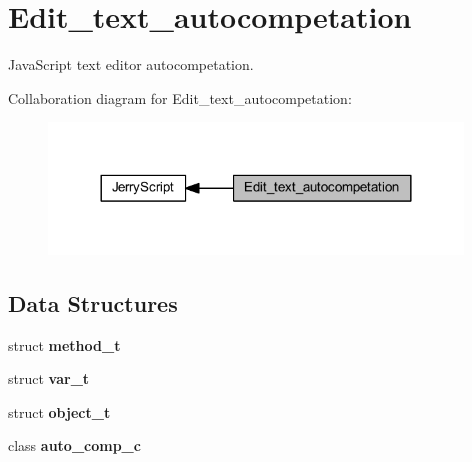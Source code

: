 \section{Edit\+\_\+text\+\_\+autocompetation}
\label{group___edit__text__autocompetation}


Java\+Script text editor autocompetation.  


Collaboration diagram for Edit\+\_\+text\+\_\+autocompetation\+:
\nopagebreak
\begin{figure}[H]
\begin{center}
\leavevmode
\includegraphics[width=312pt]{group___edit__text__autocompetation}
\end{center}
\end{figure}
\subsection*{Data Structures}
\begin{DoxyCompactItemize}
\item 
struct \textbf{ method\+\_\+t}
\item 
struct \textbf{ var\+\_\+t}
\item 
struct \textbf{ object\+\_\+t}
\item 
class \textbf{ auto\+\_\+comp\+\_\+c}
\end{DoxyCompactItemize}
